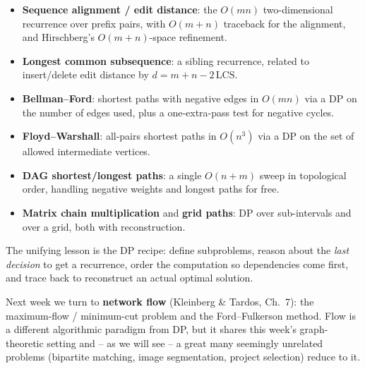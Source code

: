 \documentclass[11pt]{article}
\begin{document}
\begin{itemize}
    \item \textbf{Sequence alignment / edit distance}: the $O(mn)$ two-dimensional
    recurrence over prefix pairs, with $O(m+n)$ traceback for the alignment, and
    Hirschberg's $O(m+n)$-space refinement.
    \item \textbf{Longest common subsequence}: a sibling recurrence, related to
    insert/delete edit distance by $d = m + n - 2\,\mathrm{LCS}$.
    \item \textbf{Bellman--Ford}: shortest paths with negative edges in $O(mn)$ via a DP on
    the number of edges used, plus a one-extra-pass test for negative cycles.
    \item \textbf{Floyd--Warshall}: all-pairs shortest paths in $O(n^3)$ via a DP on the set
    of allowed intermediate vertices.
    \item \textbf{DAG shortest/longest paths}: a single $O(n+m)$ sweep in topological order,
    handling negative weights and longest paths for free.
    \item \textbf{Matrix chain multiplication} and \textbf{grid paths}: DP over sub-intervals
    and over a grid, both with reconstruction.
\end{itemize}

The unifying lesson is the DP recipe: define subproblems, reason about the \emph{last
decision} to get a recurrence, order the computation so dependencies come first, and trace
back to reconstruct an actual optimal solution.

Next week we turn to \textbf{network flow} (Kleinberg \& Tardos, Ch.\ 7): the maximum-flow /
minimum-cut problem and the Ford--Fulkerson method. Flow is a different algorithmic paradigm
from DP, but it shares this week's graph-theoretic setting and -- as we will see -- a great
many seemingly unrelated problems (bipartite matching, image segmentation, project
selection) reduce to it.
\end{document}
